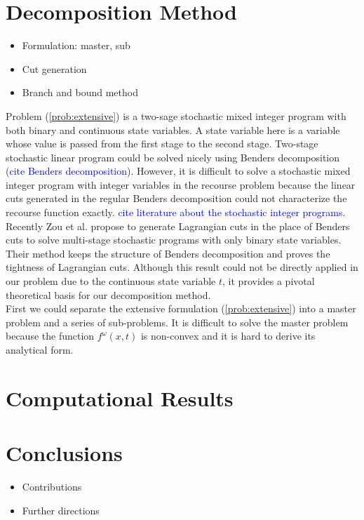 \documentclass[11pt]{article}
\begin{document}
\section{Decomposition Method} \label{sec:decomposition}
	\begin{itemize}
		\item Formulation: master, sub
		\item Cut generation
		\item Branch and bound method
	\end{itemize}
	Problem (\ref{prob:extensive}) is a two-sage stochastic mixed integer program with both binary and continuous state variables. A state variable here is a variable whose value is passed from the first stage to the second stage. Two-stage stochastic linear program could be solved nicely using Benders decomposition (\textcolor{blue}{cite Benders decomposition}). However, it is difficult to solve a stochastic mixed integer program with integer variables in the recourse problem because the linear cuts generated in the regular Benders decomposition could not characterize the recourse function exactly. \textcolor{blue}{cite literature about the stochastic integer programs}. \\
	\newline 
	Recently Zou et al. \cite{zou2016nested} propose to generate Lagrangian cuts in the place of Benders cuts to solve multi-stage stochastic programs with only binary state variables. Their method keeps the structure of Benders decomposition and proves the tightness of Lagrangian cuts. Although this result could not be directly applied in our problem due to the continuous state variable \(t\), it provides a pivotal theoretical basis for our decomposition method.\\
	\newline
	First we could separate the extensive formulation (\ref{prob:extensive}) into a master problem and a series of sub-problems. It is difficult to solve the master problem because the function \(f^\omega(x,t)\) is non-convex and it is hard to derive its analytical form.

\section{Computational Results} \label{sec:results}

\section{Conclusions} \label{sec:conclusions}
	\begin{itemize}
		\item Contributions
		\item Further directions
	\end{itemize}



\end{document}
